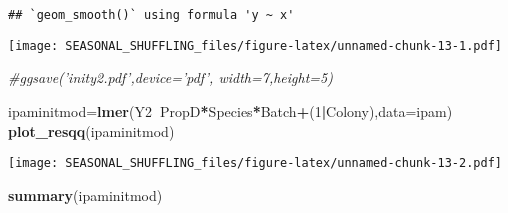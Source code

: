 \documentclass[]{article}
\newenvironment{Shaded}{\begin{snugshade}}{\end{snugshade}}
\newcommand{\CommentTok}[1]{\textcolor[rgb]{0.56,0.35,0.01}{\textit{#1}}}
\newcommand{\DataTypeTok}[1]{\textcolor[rgb]{0.13,0.29,0.53}{#1}}
\newcommand{\DecValTok}[1]{\textcolor[rgb]{0.00,0.00,0.81}{#1}}
\newcommand{\KeywordTok}[1]{\textcolor[rgb]{0.13,0.29,0.53}{\textbf{#1}}}
\newcommand{\NormalTok}[1]{#1}
\newcommand{\OperatorTok}[1]{\textcolor[rgb]{0.81,0.36,0.00}{\textbf{#1}}}
\begin{document}
\begin{verbatim}
## `geom_smooth()` using formula 'y ~ x'
\end{verbatim}

\texttt{[image: SEASONAL\_SHUFFLING\_files/figure-latex/unnamed-chunk-13-1.pdf]}

\begin{Shaded}
\begin{Highlighting}[]
\CommentTok{#ggsave('inity2.pdf',device='pdf', width=7,height=5)}

\NormalTok{ipaminitmod=}\KeywordTok{lmer}\NormalTok{(Y2}\OperatorTok{~}\NormalTok{PropD}\OperatorTok{*}\NormalTok{Species}\OperatorTok{*}\NormalTok{Batch}\OperatorTok{+}\NormalTok{(}\DecValTok{1}\OperatorTok{|}\NormalTok{Colony),}\DataTypeTok{data=}\NormalTok{ipam)}
\KeywordTok{plot_resqq}\NormalTok{(ipaminitmod)}
\end{Highlighting}
\end{Shaded}

\texttt{[image: SEASONAL\_SHUFFLING\_files/figure-latex/unnamed-chunk-13-2.pdf]}

\begin{Shaded}
\begin{Highlighting}[]
\KeywordTok{summary}\NormalTok{(ipaminitmod)}
\end{Highlighting}
\end{Shaded}
\end{document}
